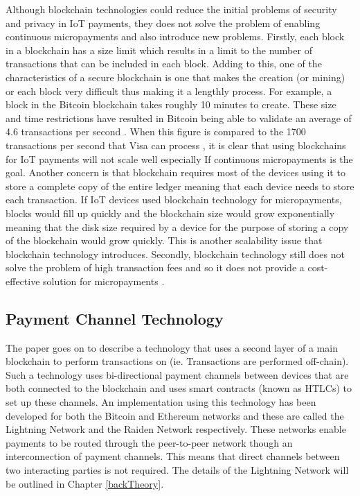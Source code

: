 Although blockchain technologies could reduce the initial problems of security and privacy in IoT payments, they does not solve the problem of enabling continuous micropayments and also introduce new problems. 
Firstly, each block in a blockchain has a size limit which results in a limit to the number of transactions that can be included in each block. Adding to this, one of the characteristics of a secure blockchain is one that makes the creation (or mining) or each block very difficult thus making it a lengthly process. For example, a block in the Bitcoin blockchain takes roughly 10 minutes to create. These size and time restrictions have resulted in Bitcoin being able to validate an average of 4.6 transactions per second \parencite{blockchain_speed}. When this figure is compared to the 1700 transactions per second that Visa can process \parencite{blockchain_speed}, it is clear that using blockchains for IoT payments will not scale well especially If continuous micropayments is the goal. 
Another concern is that blockchain requires most of the devices using it to store a complete copy of the entire ledger meaning that each device needs to store each transaction. If IoT devices used blockchain technology for micropayments, blocks would fill up quickly and the blockchain size would grow exponentially meaning that the disk size required by a device for the purpose of storing a copy of the blockchain would grow quickly. This is another scalability issue that blockchain technology introduces.
Secondly, blockchain technology still does not solve the problem of high transaction fees and so it does not provide a cost-effective solution for micropayments \parencite{micro_iot_devices}.

\subsection{Payment Channel Technology}

The paper goes on to describe a technology that uses a second layer of a main blockchain to perform transactions on (ie. Transactions are performed off-chain). Such a technology uses bi-directional payment channels between devices that are both connected to the blockchain and uses smart contracts (known as HTLCs) to set up these channels. An implementation using this technology has been developed for both the Bitcoin and Ethereum networks and these are called the Lightning Network and the Raiden Network respectively. These networks enable payments to be routed through the peer-to-peer network though an interconnection of payment channels. This means that direct channels between two interacting parties is not required. The details of the Lightning Network will be outlined in Chapter \ref{backTheory}.

